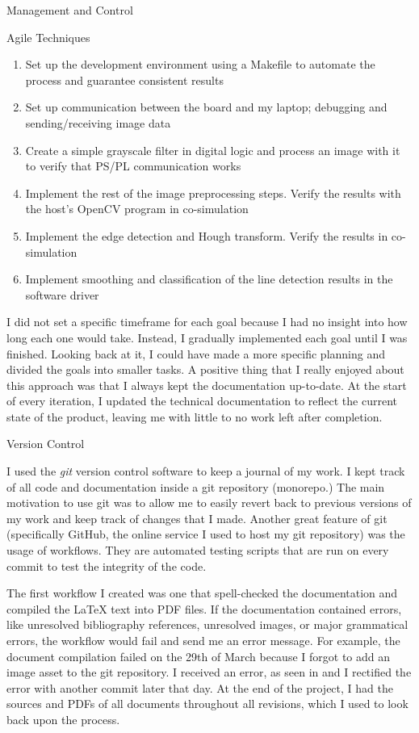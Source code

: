\documentclass{matthijs}
\begin{document}
\begin{hoofdstuk}{Management and Control}
\begin{paragraaf}{Agile Techniques}
\begin{enumerate}
				\item Set up the development environment using a Makefile to automate the process and guarantee consistent results
				\item Set up communication between the board and my laptop; debugging and sending/receiving image data
				\item Create a simple grayscale filter in digital logic and process an image with it to verify that PS/PL communication works
				\item Implement the rest of the image preprocessing steps. Verify the results with the host's OpenCV program in co-simulation
				\item Implement the edge detection and Hough transform. Verify the results in co-simulation
				\item Implement smoothing and classification of the line detection results in the software driver

			\end{enumerate}

			\noindent I did not set a specific timeframe for each goal because I had no insight into how long each one would take.
			Instead, I gradually implemented each goal until I was finished. Looking back at it, I could have made a more specific planning and divided the goals into smaller tasks.
			A positive thing that I really enjoyed about this approach was that I always kept the documentation up-to-date.
			At the start of every iteration, I updated the technical documentation to reflect the current state of the product, leaving me with little to no work left after completion.

		\end{paragraaf}

		\begin{paragraaf}{Version Control}

			I used the \textit{git} version control software to keep a journal of my work.
			I kept track of all code and documentation inside a git repository (monorepo.)
			The main motivation to use git was to allow me to easily revert back to previous versions of my work and keep track of changes that I made.
			Another great feature of git (specifically GitHub, the online service I used to host my git repository) was the usage of workflows.
			They are automated testing scripts that are run on every commit to test the integrity of the code.

			The first workflow I created was one that spell-checked the documentation and compiled the LaTeX text into PDF files.
			If the documentation contained errors, like unresolved bibliography references, unresolved images, or major grammatical errors, the workflow would fail and send me an error message.
			For example, the document compilation failed on the 29th of March because I forgot to add an image asset to the git repository. I received an error, as seen in  and I rectified the error with another commit later that day.
			At the end of the project, I had the sources and PDFs of all documents throughout all revisions, which I used to look back upon the process.


\end{paragraaf}
\end{hoofdstuk}
\end{document}
